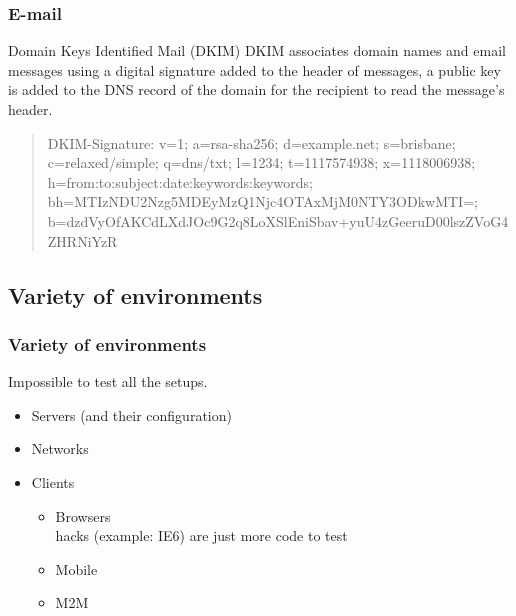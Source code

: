 \begin{frame}
\frametitle{E-mail}
\begin{block}{Domain Keys Identified Mail (DKIM)}
DKIM associates domain names and email messages using a digital signature
added to the header of messages, a public key is added to the DNS record of the
domain for the recipient to read the message's header.
\begin{quote}
DKIM-Signature: v=1; a=rsa-sha256; d=example.net; s=brisbane;
c=relaxed/simple; q=dns/txt; l=1234; t=1117574938; x=1118006938;
h=from:to:subject:date:keywords:keywords;
bh=MTIzNDU2Nzg5MDEyMzQ1Njc4OTAxMjM0NTY3ODkwMTI=;
b=dzdVyOfAKCdLXdJOc9G2q8LoXSlEniSbav+yuU4zGeeruD00lszZVoG4ZHRNiYzR
\end{quote}
\end{block}
\end{frame}

\subsection{Variety of environments}

\begin{frame}
\frametitle{Variety of environments}
\begin{center}
Impossible to test all the setups.
\end{center}
\begin{itemize}
\item Servers {\small (and their configuration)}
\item Networks
\item Clients
	\begin{itemize}
	\item Browsers
		\\ hacks {\small (example: IE6)} are just more code to test
	\item Mobile
	\item M2M
	\end{itemize}
\end{itemize}
\end{frame}

